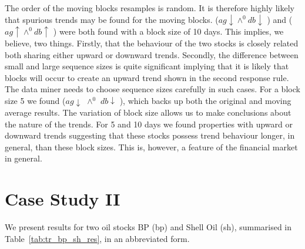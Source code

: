 The order of the moving blocks resamples is random. It is therefore
highly likely that spurious trends may be found for the moving blocks.
 ($ag \downarrow \wedge^{0} db \downarrow$ ) and  
($ag \uparrow \wedge^{0} db \uparrow$ ) were both found with a block size
of 10 days. This implies, we believe, two things. Firstly, that the
behaviour of the two stocks is closely related both sharing either
upward or downward trends. Secondly, the difference between small and
large sequence sizes is quite significant implying that it is likely
that blocks will occur to create an upward trend shown in the second
response rule. The data miner needs to choose sequence sizes carefully
in such cases. For a block size 5 we found  ($ ag \downarrow$
$\wedge^0$ $ db \downarrow$ ), which backs up both the original and moving
average results. The variation of block size allows us to make
conclusions about the nature of the trends. For 5 and 10 days we found
properties with upward or downward trends suggesting that these stocks
possess trend behaviour longer, in general, than these block
sizes. This is, however, a feature of the financial market in general.


\section{Case Study II}

We present results for two oil stocks BP (bp) and Shell Oil (sh),
summarised in Table~\ref{tab:tr_bp_sh_res}, in an abbreviated form.

